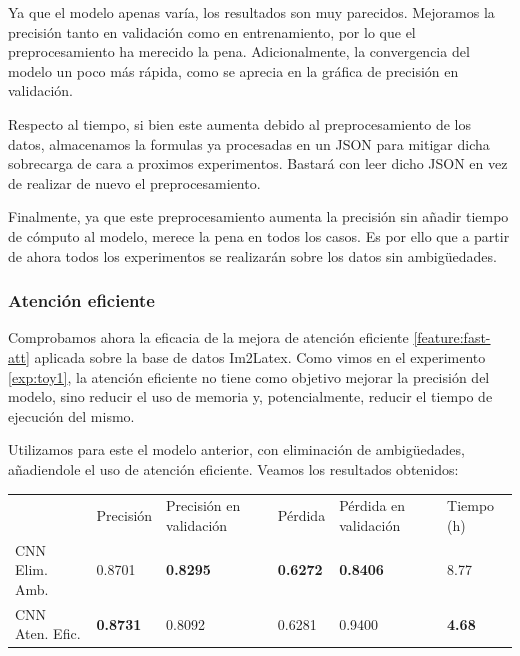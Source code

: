 \documentclass[a4paper, 20pt, dvipsnames]{article}
\begin{document}
Ya que el modelo apenas varía, los resultados son muy parecidos. Mejoramos la
precisión tanto en validación como en entrenamiento, por lo que el preprocesamiento
ha merecido la pena. Adicionalmente, la convergencia del modelo un poco más rápida,
como se aprecia en la gráfica de precisión en validación.

Respecto al tiempo, si bien este aumenta debido al preprocesamiento de los datos,
almacenamos la formulas ya procesadas en un JSON para mitigar dicha sobrecarga de
cara a proximos experimentos. Bastará con leer dicho JSON en vez de realizar de
nuevo el preprocesamiento.

Finalmente, ya que este preprocesamiento aumenta la precisión sin añadir tiempo de
cómputo al modelo, merece la pena en todos los casos. Es por ello que a partir de
ahora todos los experimentos se realizarán sobre los datos sin ambigüedades.

\subsubsection{Atención eficiente}
\label{exp:3a}

Comprobamos ahora la eficacia de la mejora de atención eficiente \ref{feature:fast-att} aplicada sobre la base de datos Im2Latex. Como vimos en el experimento \ref{exp:toy1}, la atención eficiente no tiene como objetivo mejorar la precisión del modelo, sino reducir el uso de memoria y, potencialmente, reducir el tiempo de ejecución del mismo.

Utilizamos para este el modelo anterior, con eliminación de ambigüedades, añadiendole el uso de atención eficiente. Veamos los resultados obtenidos:

\begin{table}[H]
	\centering
	\begin{tabular}{llllll}
		& Precisión       & Precisión en validación & Pérdida         & Pérdida en validación & Tiempo (h)    \\ \cline{2-6} 
		CNN Elim. Amb.  & 0.8701          & \textbf{0.8295}         & \textbf{0.6272} & \textbf{0.8406}       & 8.77          \\
		CNN Aten. Efic. & \textbf{0.8731} & 0.8092                  & 0.6281          & 0.9400                & \textbf{4.68}
	\end{tabular}
\end{table}
\end{document}
